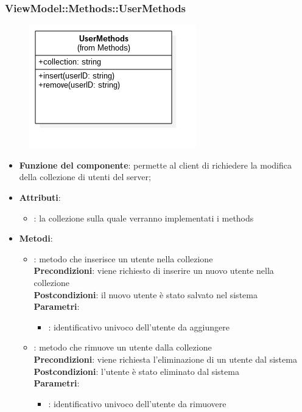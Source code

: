 \subsubsection{ViewModel::Methods::UserMethods}
\begin{figure}[h!]
\begin{center}
	\includegraphics[scale=0.4]{../images/ViewModel/Methods/UserMethods.png}
\end{center}
\end{figure}
\begin{itemize}
\item\textbf{Funzione del componente}: permette al client di richiedere la modifica della collezione di utenti del server;
\item\textbf{Attributi}:
	\begin{itemize}
		\item{}: la collezione sulla quale verranno implementati i methods\\
	\end{itemize}
\item\textbf{Metodi}:
	\begin{itemize}
		\item{}: metodo che inserisce un utente nella collezione\\
		\textbf{Precondizioni}: viene richiesto di inserire un nuovo utente nella collezione\\
		\textbf{Postcondizioni}: il nuovo utente è stato salvato nel sistema\\
		\textbf{Parametri}:
			\begin{itemize}
				\item{}: identificativo univoco dell'utente da aggiungere\\
			\end{itemize}
		\item{}: metodo che rimuove un utente dalla collezione\\
		\textbf{Precondizioni}: viene richiesta l'eliminazione di un utente dal sistema\\
		\textbf{Postcondizioni}: l'utente è stato eliminato dal sistema\\
		\textbf{Parametri}:
			\begin{itemize}
				\item{}: identificativo univoco dell'utente da rimuovere\\
			\end{itemize}
	\end{itemize}
\end{itemize}
\newpage

